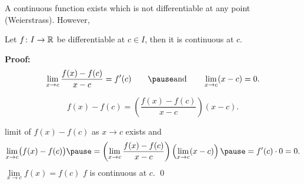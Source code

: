 \documentclass[10pt,aspectratio=149]{beamer}
\begin{document}
\begin{frame}
A continuous function exists which is not differentiable at any point
(Weierstrass).
\pause
However,

\begin{proposition}
Let $f \colon I \to {\mathbb{R}}$ be differentiable at $c \in I$,
then it is continuous at $c$.
\end{proposition}

\pause
\textbf{Proof:}
\begin{equation*}
\lim_{x\to c}\frac{f(x)-f(c)}{x-c} = f'(c)
\qquad
\pause
\text{and}
\qquad
\lim_{x\to c}(x-c) = 0 .
\end{equation*}

\pause
\begin{equation*}
f(x)-f(c) = 
\left( \frac{f(x)-f(c)}{x-c} \right) (x-c) .
\end{equation*}

\pause
\thus \quad limit of $f(x)-f(c)$ as $x \to c$ exists
\pause
and
\begin{equation*}
\lim_{x\to c} \bigl( f(x)-f(c) \bigr)
\pause
=
\left(\lim_{x\to c} \frac{f(x)-f(c)}{x-c} \right)
\left(\lim_{x\to c} (x-c) \right)
\pause
=
f'(c) \cdot 0  = 0.
\end{equation*}
\pause
\thus \quad $\lim\limits_{x\to c} f(x) = f(c)$
\pause
\wthus $f$ is continuous at $c$.
\qed

\end{frame}
\end{document}
